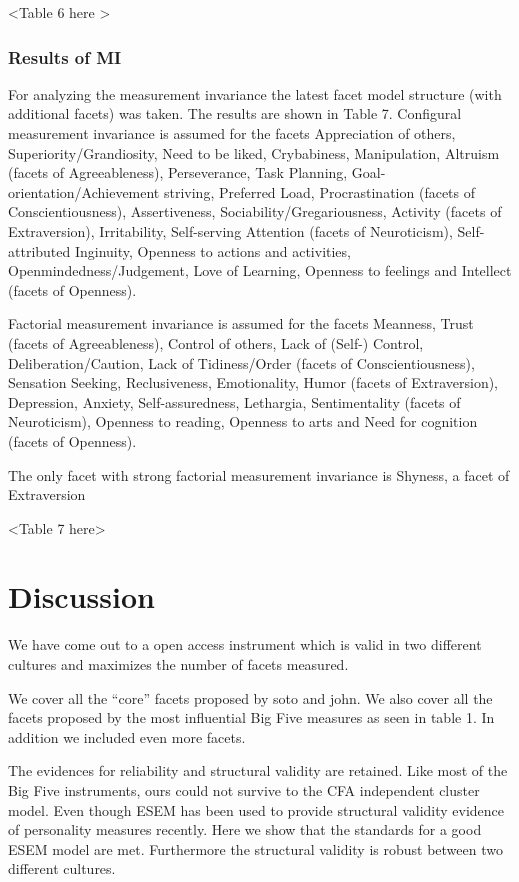 \documentclass[man]{apa6}
\theoremstyle{definition}
\theoremstyle{definition}
\theoremstyle{definition}
\theoremstyle{remark}
\begin{document}
\textless{}Table 6 here \textgreater{}

\hypertarget{results-of-mi}{%
\subsubsection{Results of MI}\label{results-of-mi}}

For analyzing the measurement invariance the latest facet model
structure (with additional facets) was taken. The results are shown in
Table 7. Configural measurement invariance is assumed for the facets
Appreciation of others, Superiority/Grandiosity, Need to be liked,
Crybabiness, Manipulation, Altruism (facets of Agreeableness),
Perseverance, Task Planning, Goal-orientation/Achievement striving,
Preferred Load, Procrastination (facets of Conscientiousness),
Assertiveness, Sociability/Gregariousness, Activity (facets of
Extraversion), Irritability, Self-serving Attention (facets of
Neuroticism), Self-attributed Inginuity, Openness to actions and
activities, Openmindedness/Judgement, Love of Learning, Openness to
feelings and Intellect (facets of Openness).

Factorial measurement invariance is assumed for the facets Meanness,
Trust (facets of Agreeableness), Control of others, Lack of (Self-)
Control, Deliberation/Caution, Lack of Tidiness/Order (facets of
Conscientiousness), Sensation Seeking, Reclusiveness, Emotionality,
Humor (facets of Extraversion), Depression, Anxiety, Self-assuredness,
Lethargia, Sentimentality (facets of Neuroticism), Openness to reading,
Openness to arts and Need for cognition (facets of Openness).

The only facet with strong factorial measurement invariance is Shyness,
a facet of Extraversion

\textless{}Table 7 here\textgreater{}

\hypertarget{discussion}{%
\section{Discussion}\label{discussion}}

We have come out to a open access instrument which is valid in two
different cultures and maximizes the number of facets measured.

We cover all the \enquote{core} facets proposed by soto and john. We
also cover all the facets proposed by the most influential Big Five
measures as seen in table 1. In addition we included even more facets.

The evidences for reliability and structural validity are retained. Like
most of the Big Five instruments, ours could not survive to the CFA
independent cluster model. Even though ESEM has been used to provide
structural validity evidence of personality measures recently. Here we
show that the standards for a good ESEM model are met. Furthermore the
structural validity is robust between two different cultures.
\end{document}
